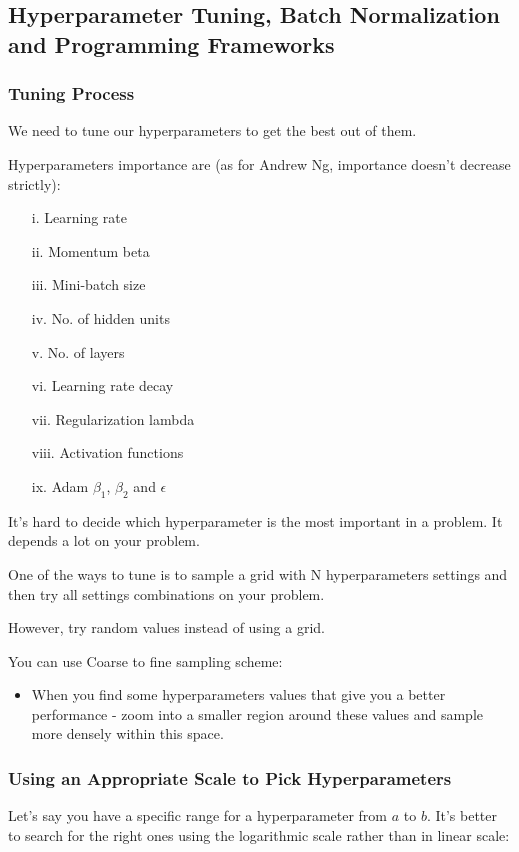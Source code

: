 \subsection{Hyperparameter Tuning, Batch Normalization and Programming Frameworks}
\subsubsection{Tuning Process}
We need to tune our hyperparameters to get the best out of them.

Hyperparameters importance are (as for Andrew Ng, importance doesn't decrease strictly):

\begin{itemize}
    \item[i.] Learning rate
    \item[ii.] Momentum beta
    \item[iii.] Mini-batch size
    \item[iv.] No. of hidden units
    \item[v.] No. of layers
    \item[vi.] Learning rate decay
    \item[vii.] Regularization lambda
    \item[viii.] Activation functions
    \item[ix.] Adam $\beta_1$, $\beta_2$ and $\epsilon$
\end{itemize}

It's hard to decide which hyperparameter is the most important in a problem. It depends a lot on your problem.

One of the ways to tune is to sample a grid with N hyperparameters settings and then try all settings combinations on your problem.

However, try random values instead of using a grid.

You can use Coarse to fine sampling scheme:

\begin{itemize}
    \item When you find some hyperparameters values that give you a better performance - zoom into a smaller region around these values and sample more densely within this space.
\end{itemize}

\subsubsection{Using an Appropriate Scale to Pick Hyperparameters}
Let's say you have a specific range for a hyperparameter from $a$ to $b$. It's better to search for the right ones using the logarithmic scale rather than in linear scale:


